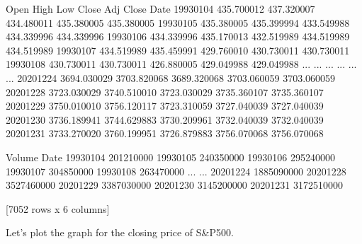 \documentclass[letterpaper,10pt,english]{jupyterBook}
\begin{document}
\begin{sphinxVerbatim}[commandchars=\\\{\}]
\end{sphinxVerbatim}

\begin{sphinxVerbatim}[commandchars=\\\{\}]
                   Open         High          Low        Close    Adj Close  \PYGZbs{}
Date                                                                          
1993\PYGZhy{}01\PYGZhy{}04   435.700012   437.320007   434.480011   435.380005   435.380005   
1993\PYGZhy{}01\PYGZhy{}05   435.380005   435.399994   433.549988   434.339996   434.339996   
1993\PYGZhy{}01\PYGZhy{}06   434.339996   435.170013   432.519989   434.519989   434.519989   
1993\PYGZhy{}01\PYGZhy{}07   434.519989   435.459991   429.760010   430.730011   430.730011   
1993\PYGZhy{}01\PYGZhy{}08   430.730011   430.730011   426.880005   429.049988   429.049988   
...                 ...          ...          ...          ...          ...   
2020\PYGZhy{}12\PYGZhy{}24  3694.030029  3703.820068  3689.320068  3703.060059  3703.060059   
2020\PYGZhy{}12\PYGZhy{}28  3723.030029  3740.510010  3723.030029  3735.360107  3735.360107   
2020\PYGZhy{}12\PYGZhy{}29  3750.010010  3756.120117  3723.310059  3727.040039  3727.040039   
2020\PYGZhy{}12\PYGZhy{}30  3736.189941  3744.629883  3730.209961  3732.040039  3732.040039   
2020\PYGZhy{}12\PYGZhy{}31  3733.270020  3760.199951  3726.879883  3756.070068  3756.070068   

                Volume  
Date                    
1993\PYGZhy{}01\PYGZhy{}04   201210000  
1993\PYGZhy{}01\PYGZhy{}05   240350000  
1993\PYGZhy{}01\PYGZhy{}06   295240000  
1993\PYGZhy{}01\PYGZhy{}07   304850000  
1993\PYGZhy{}01\PYGZhy{}08   263470000  
...                ...  
2020\PYGZhy{}12\PYGZhy{}24  1885090000  
2020\PYGZhy{}12\PYGZhy{}28  3527460000  
2020\PYGZhy{}12\PYGZhy{}29  3387030000  
2020\PYGZhy{}12\PYGZhy{}30  3145200000  
2020\PYGZhy{}12\PYGZhy{}31  3172510000  

[7052 rows x 6 columns]
\end{sphinxVerbatim}

\sphinxAtStartPar
Let’s plot the graph for the closing price of S\&P500.

\begin{sphinxVerbatim}[commandchars=\\\{\}]
\PYG{p}{[}\PYG{p}{]}   
\end{sphinxVerbatim}
\end{document}
